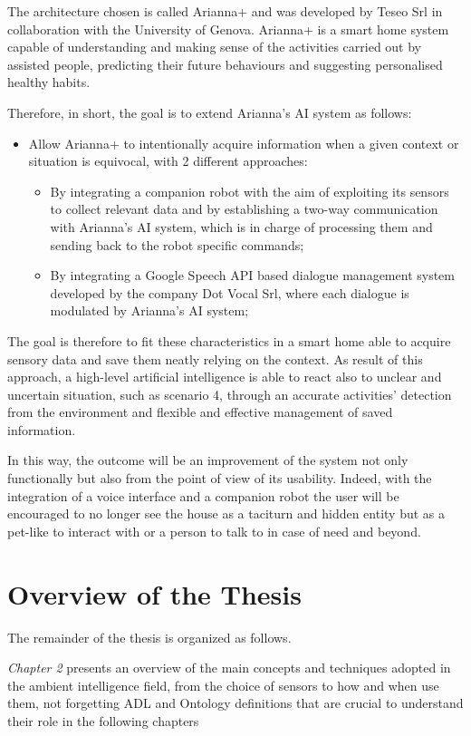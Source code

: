\documentclass{thesisreport}
\begin{document}
 The architecture chosen is called Arianna+ and was developed by Teseo Srl in collaboration with the University of Genova. Arianna+ is a smart home system capable of understanding and making sense of the activities carried out by assisted people, predicting their future behaviours and suggesting personalised healthy habits.
 
 Therefore, in short, the goal is to extend Arianna's AI system as follows:
 \begin{itemize}
     \item Allow Arianna+ to intentionally acquire information when a given context or situation is equivocal, with 2 different approaches:
     \begin{itemize}
         \item By integrating a companion robot with the aim of exploiting its sensors to collect relevant data and by establishing a two-way communication with Arianna’s AI system, which is in charge of processing them and sending back to the robot specific commands;
         \item By integrating a Google Speech API based dialogue management system developed by the company Dot Vocal Srl, where each dialogue is modulated by Arianna’s AI system; 
     \end{itemize}
 \end{itemize}

 The goal is therefore to fit these characteristics in a smart home able to acquire sensory data and save them neatly relying on the context. As result of this approach, a high-level artificial intelligence is able to react also to unclear and uncertain situation, such as scenario 4, through an accurate activities’ detection from the environment and flexible and effective management of saved information.
 
 In this way, the outcome will be an improvement of the system not only functionally but also from the point of view of its usability.
 Indeed, with the integration of a voice interface and a companion robot the user will be encouraged to no longer see the house as a taciturn and hidden entity but as a pet-like to interact with or a person to talk to in case of need and beyond.
 
\section{Overview of the Thesis}
The remainder of the thesis is organized as follows. 

\quad \textit{Chapter 2} presents an overview of the main concepts and techniques adopted in the ambient intelligence field, from the choice of sensors to how and when use them, not forgetting ADL and Ontology definitions that are crucial to understand their role in the following chapters
\end{document}
